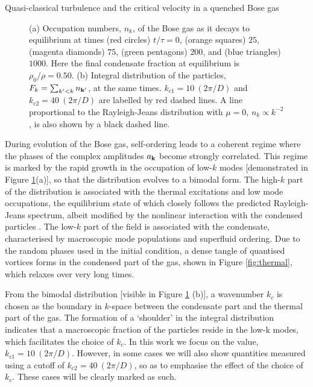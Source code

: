 \begin{chapter}{\label{cha:nonequib}Quasi-classical turbulence and the critical velocity in a quenched Bose gas}
\begin{figure}
\begin{center}
%
    \end{center}%
  \caption{\label{fig:occupation} (a) Occupation numbers, $n_k$, of the Bose gas as it decays to equilibrium at times (red circles) $t/\tau=0$, (orange squares) $25$, (magenta diamonds) $75$, (green pentagons) $200$, and (blue triangles) $1000$. Here the final condensate fraction at equilibrium is $\rho_0/\rho = 0.50$. (b) Integral distribution of the particles, $F_k = \sum_{k'<k} n_{\bf k'}$, at the same times. $k_{c1} = 10~(2\pi/D)$ and $k_{c2} = 40~(2\pi/D)$ are labelled by red dashed lines. A line proportional to the Rayleigh-Jeans distribution with $\mu=0$, $n_k \propto k^{-2}$, is also shown by a black dashed line.}
\end{figure}

During evolution of the Bose gas, self-ordering leads to a coherent regime where the phases of the complex amplitudes $a_{\bf k}$ become strongly correlated. This regime is marked by the rapid growth in the occupation of low-$k$ modes [demonstrated in Figure \ref{fig:occupation}(a)], so that the distribution evolves to a bimodal form. The high-$k$ part of the distribution is associated with the thermal excitations and low mode occupations, the equilibrium state of which closely follows the predicted Rayleigh-Jeans spectrum, albeit modified by the nonlinear interaction with the condensed particles \cite{PhysRevLett.95.263901}. The low-$k$ part of the field is associated with the condensate, characterised by macroscopic mode populations and superfluid ordering. Due to the random phases used in the initial condition, a dense tangle of quantised vortices forms in the condensed part of the gas, shown in Figure \ref{fig:thermal}, which relaxes over very long times.


From the bimodal distribution [visible in Figure \ref{fig:occupation} (b)], a wavenumber $k_c$ is chosen as the boundary in $k$-space between the condensate part and the thermal part of the gas. The formation of a `shoulder' in the integral distribution indicates that a macroscopic fraction of the particles reside in the low-k modes, which facilitates the choice of $k_c$. In this work we focus on the value, $k_{c1} = 10~(2\pi/D)$. However, in some cases we will also show quantities measured using a cutoff of $k_{c2} = 40~(2\pi/D)$, so as to emphasise the effect of the choice of $k_{c}$. These cases will be clearly marked as such.


\end{chapter}
